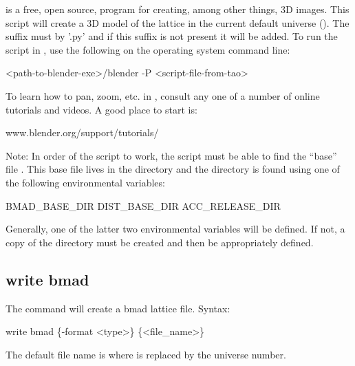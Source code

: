 {{{{{{{{{ is a free, open source, program
for creating, among other things, 3D images. This script will create a 3D model of the
lattice in the current default universe (). The suffix must by '.py' and
if this suffix is not present it will be added. To run the script in , use the
following on the operating system command line:
\begin{example}
  <path-to-blender-exe>/blender -P <script-file-from-tao>
\end{example}
To learn how to pan, zoom, etc. in , consult any one of a number of online
tutorials and videos. A good place to start is:
\begin{example}
  www.blender.org/support/tutorials/  
\end{example}
Note: In order of the script to work, the script must be able to find the ``base'' file
. This base file lives in the  directory and the
 directory is found using one of the following environmental variables:
\begin{example}
  BMAD_BASE_DIR
  DIST_BASE_DIR
  ACC_RELEASE_DIR
\end{example}
Generally, one of the latter two environmental variables will be defined.  If not, a copy
of the \bmad directory must be created and then  be appropriately
defined.


\subsection{write bmad}
\label{s:write.bmad}

The  command will create a bmad lattice file. Syntax:
\begin{example}
    write bmad \{-format <type>\} \{<file_name>\} 
\end{example}

The default file name is  where \vn{\#} is replaced by the universe number. 

}}}}}}}}}
